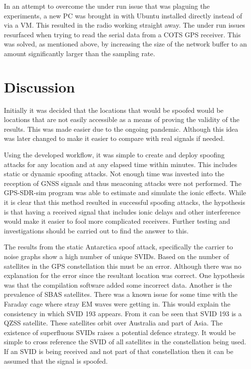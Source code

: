 In an attempt to overcome the under run issue that was plaguing the experiments, a new PC was brought in with Ubuntu installed directly instead of via a VM. This resulted
in the radio working straight away. The under run issues resurfaced when trying to read the serial data from a COTS GPS receiver. This was solved, as mentioned above, by
increasing the size of the network buffer to an amount significantly larger than the sampling rate.

\section{Discussion}
Initially it was decided that the locations that would be spoofed would be locations that are not easily accessible as a means of proving the validity of the results.
This was made easier due to the ongoing pandemic. Although this idea was later changed to make it easier to compare with real signals if needed.

Using the developed workflow, it was simple to create and deploy spoofing attacks for any location and at any elapsed time within minutes. This includes static or dynamic
spoofing attacks. Not enough time was invested into the reception of GNSS signals and thus meaconing attacks were not performed. The GPS-SDR-sim program was able to
estimate and simulate the ionic effects. While it is clear that this method resulted in successful spoofing attacks, the hypothesis is that having a received signal that includes ionic delays
and other interference would make it easier to fool more complicated receivers. Further testing and investigations should be carried out to find the answer to this. 

The results from the static Antarctica spoof attack, specifically the carrier to noise graphs show a high number of unique SVIDs. Based on the number of satellites in the
GPS constellation this must be an error. Although there was no explanation for the error since the resultant location was correct. One hypothesis was that the compilation
software added some incorrect data. Another is the prevalence of SBAS satellites. There was a known issue for some time with the Faraday cage where stray EM waves were
getting in. This would explain the consistency in which SVID 193 appears. From \cite{RN67} it can be seen that SVID 193 is a QZSS satellite. These satellites orbit over
Australia and part of Asia. The existence of superfluous SVIDs raises a potential defence strategy. It would be simple to cross reference the SVID of all satellites in
the constellation being used. If an SVID is being received and not part of that constellation then it can be assumed that the signal is spoofed. 

